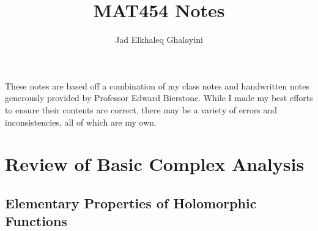 \documentclass{article}
\title{MAT454 Notes}
\author{Jad Elkhaleq Ghalayini}
\begin{document}
\maketitle

These notes are based off a combination of my class notes and handwritten notes generously provided by Professor Edward Bierstone. While I made my best efforts to ensure their contents are correct, there may be a variety of errors and inconsistencies, all of which are my own.

\tableofcontents
\newpage

\section{Review of Basic Complex Analysis}

\subsection{Elementary Properties of Holomorphic Functions}
\end{document}
